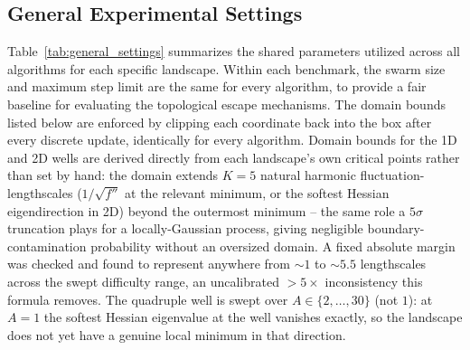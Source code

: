\documentclass{article}
\theoremstyle{plain}
\theoremstyle{definition}
\theoremstyle{remark}
\begin{document}
\subsection{General Experimental Settings}
Table~\ref{tab:general_settings} summarizes the shared parameters utilized across all algorithms for each specific landscape. Within each benchmark, the swarm size and maximum step limit are the same for every algorithm, to provide a fair baseline for evaluating the topological escape mechanisms. The domain bounds listed below are enforced by clipping each coordinate back into the box after every discrete update, identically for every algorithm. Domain bounds for the 1D and 2D wells are derived directly from each landscape's own critical points rather than set by hand: the domain extends $K=5$ natural harmonic fluctuation-lengthscales ($1/\sqrt{f''}$ at the relevant minimum, or the softest Hessian eigendirection in 2D) beyond the outermost minimum -- the same role a $5\sigma$ truncation plays for a locally-Gaussian process, giving negligible boundary-contamination probability without an oversized domain. A fixed absolute margin was checked and found to represent anywhere from $\sim\!1$ to $\sim\!5.5$ lengthscales across the swept difficulty range, an uncalibrated $>\!5\times$ inconsistency this formula removes. The quadruple well is swept over $A\in\{2,\dots,30\}$ (not $1$): at $A=1$ the softest Hessian eigenvalue at the well vanishes exactly, so the landscape does not yet have a genuine local minimum in that direction.
\end{document}
